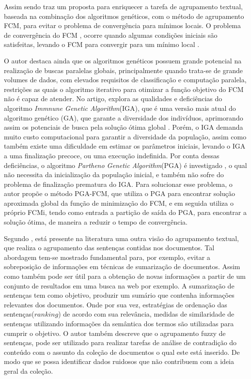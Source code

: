 Assim sendo \cite{Jiang2013} 
traz um proposta para enriquecer a tarefa de agrupamento textual, baseada na
combinação dos algoritmos genéticos, com o método de agrupamento FCM, para 
evitar o problema de convergência para mínimos locais. O problema de convergência do FCM 
, ocorre quando algumas condições iniciais são satisfeitas, levando o FCM para 
convergir para um mínimo local \cite{Bezdek1984}.

O autor destaca ainda que os algoritmos genéticos possuem grande potencial na realização de
buscas paralelas globais, principalmente quando trata-se de grande volumes de dados, com elevados
requisitos de classificação e computação paralela, restrições as quais o algoritmo iterativo para
otimizar a função objetivo do FCM não é capaz de atender.
No artigo, explora as qualidades e deficiências do algoritmo 
\textit{Immnune Genetic Algorithm}(IGA), que é uma versão mais atual do algoritmo genético (GA),
que garante a diversidade dos indivíduos, aprimorando assim os potenciais de busca pela solução
ótima global \cite{Jiang2013}. Porém, o IGA demanda muito custo computacional para garantir a diversidade da
população, assim como também existe uma dificuldade em estimar os parâmetros iniciais, levando o IGA
a uma finalização precoce, ou uma execução indefinida. Por conta dessas deficiências, 
o algoritmo \textit{Partheno Genetic Algorithm}(PGA) é investigado
, o qual não necessita da inicialização da
população inicial, e também não sofre do problema de finalização prematura do IGA. Para solucionar esse problema, o autor
propõe o método PGA-FCM, que utiliza o PGA para encontrar solução aproximada global da função de
minimização do FCM, e em seguida utiliza o próprio FCMi, tendo como entrada a partição de saída do
PGA, para encontrar a solução ótima, de maneira a reduzir o tempo de convergência.

Segundo \cite{Saranya2014}, está presente na literatura uma outra visão do agrupamento textual, que
realiza o agrupamento das sentenças contidas nos documentos. Tal abordagem tem-se mostrado 
fundamental para, por exemplo, evitar a sobreposição de informações em técnicas de sumarização de 
documentos. Assim como também
pode ser útil para a obtenção de novas informações a partir de um conjunto de resultados em uma
busca na web por exemplo. A sumarização de sentenças tem como objetivo, produzir um sumário que
contenha informações relevantes dos documentos. Onde por sua vez, estratégias de ordenação das
sentenças($ranking$) de acordo com sua relevância, medidas de similaridade de sentenças utilizando
informações da semântica dos termos são utilizadas para cumprir o objetivo. O autor também 
descreve que o agrupamento fuzzy de sentenças, pode ser utilizado para realizar
tarefas de análise de contradição do conteúdo com o assunto da coleção de documentos o qual este
está inserido. De modo que se possa identificar dados ruidosos que não contribuem com a ideia geral
da coleção.

